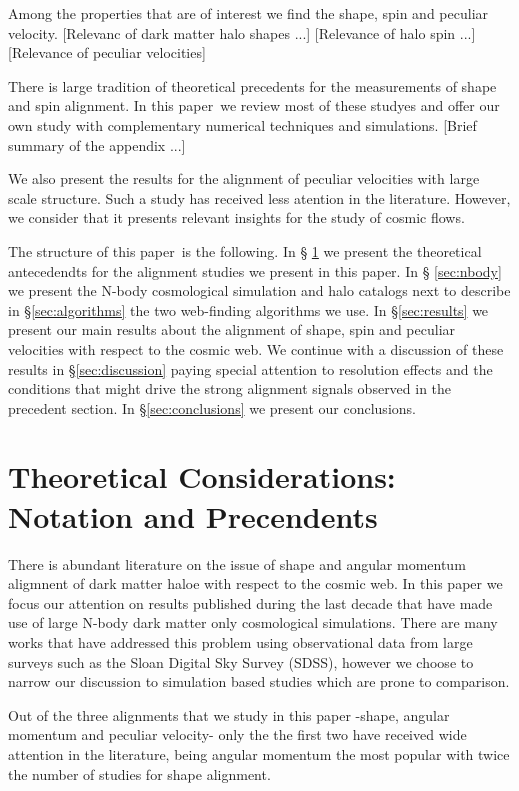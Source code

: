 \documentclass[usenatbib]{mn2e}
\newcommand{\documentname}{paper~}
\begin{document}
Among the properties that are of interest we find the shape, spin and
peculiar velocity. [Relevanc of dark matter halo shapes ...]
[Relevance of halo spin ...] [Relevance of peculiar velocities]

There is large tradition of theoretical precedents for the
measurements of shape and spin alignment. In this \documentname we
review most of these studyes and offer our own study with
complementary numerical techniques and simulations. [Brief summary of
  the appendix ...]

We also present the results for the alignment of peculiar velocities
with large scale structure. Such a study has received less atention in
the literature. However, we consider that it presents relevant
insights for the study of cosmic flows.

The structure of this \documentname is the following. In \S
\ref{sec:theory} we present the theoretical antecedendts for the
alignment studies we present in this paper. In \S
\ref{sec:nbody} we present the N-body
cosmological simulation and halo catalogs next to describe in
\S\ref{sec:algorithms} the two web-finding algorithms we use. In
\S\ref{sec:results} we present our main results about the alignment
of shape, spin and peculiar velocities with respect to the cosmic
web. We continue with a discussion of these results in
\S\ref{sec:discussion} paying special attention to resolution effects
and the conditions that might drive the strong alignment signals
observed in the precedent section. In \S\ref{sec:conclusions} we
present our conclusions.


\section{Theoretical Considerations: Notation and Precendents}
\label{sec:theory}

There is abundant literature on the issue of shape and angular momentum
aligmnent of dark matter haloe with respect to the cosmic web. In this
paper we focus our attention on results published during the last
decade that have made use of large N-body dark matter only
cosmological simulations. There are many works that have addressed
this problem using observational data from large surveys such as the
Sloan Digital Sky Survey (SDSS), however we choose to narrow our
discussion to simulation based studies which are prone to comparison.

Out of the three alignments that we study in this paper -shape,
angular momentum and peculiar velocity- only the the first two have
received wide attention in the literature, being angular momentum the
most popular with twice the number of studies for shape alignment.
\end{document}
